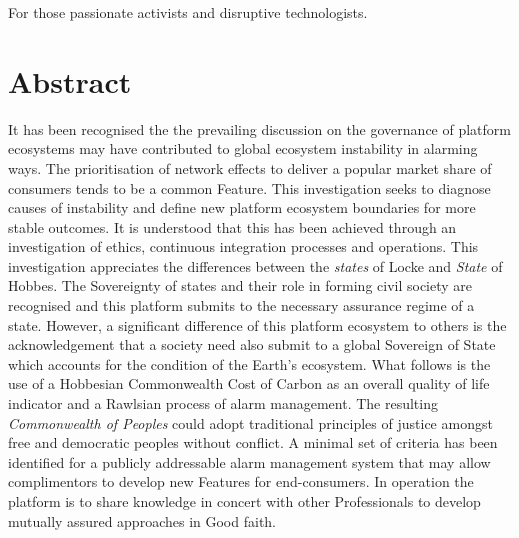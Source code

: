 \documentclass[11pt, oneside]{article}   	%
\begin{document}
\newpage
\thispagestyle{empty}
\mbox{}
\newpage

\vspace*{50mm}
\begin{center}
For those passionate activists and disruptive technologists.
\end{center}

\newpage
\thispagestyle{empty}
\mbox{}
\newpage

\section*{Abstract}
It has been recognised the the prevailing discussion on the governance of platform ecosystems may have contributed to global ecosystem instability in alarming ways.
The prioritisation of network effects to deliver a popular market share of consumers tends to be a common Feature.
This investigation seeks to diagnose causes of instability and define new platform ecosystem boundaries for more stable outcomes.
It is understood that this has been achieved through an investigation of ethics, continuous integration processes and operations.
This investigation appreciates the differences between the \emph{states} of Locke and \emph{State} of Hobbes.
The Sovereignty of states and their role in forming civil society are recognised and this platform submits to the necessary assurance regime of a state.
However, a significant difference of this platform ecosystem to others is the acknowledgement that a society need also submit to a global Sovereign of State which accounts for the condition of the Earth's ecosystem.
What follows is the use of a Hobbesian Commonwealth Cost of Carbon as an overall quality of life indicator and a Rawlsian process of alarm management.
The resulting \emph{Commonwealth of Peoples} could adopt traditional principles of justice amongst free and democratic peoples without conflict.
A minimal set of criteria has been identified for a publicly addressable alarm management system that may allow complimentors to develop new Features for end-consumers.
In operation the platform is to share knowledge in concert with other Professionals to develop mutually assured approaches in Good faith.

\newpage
\thispagestyle{empty}
\mbox{}
\newpage
\end{document}
